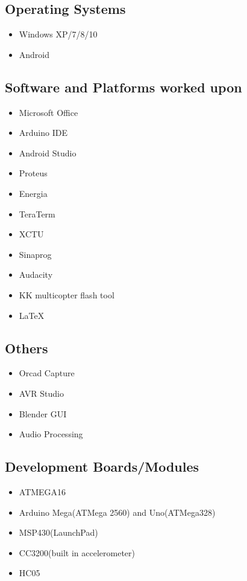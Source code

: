\documentclass[11pt]{article}
\begin{document}
\begin{minipage}{0.80\linewidth}
\subsection{Operating Systems}
\begin{itemize}
\item Windows XP/7/8/10
\item Android
\end{itemize}
\subsection{Software and Platforms worked upon}
\begin{itemize}
\item Microsoft Office
\item Arduino IDE
\item Android Studio
\item Proteus
\item Energia
\item TeraTerm
\item XCTU
\item Sinaprog
\item Audacity
\item KK multicopter flash tool
\item LaTeX
\end{itemize}
\subsection{Others}
\begin{itemize}
\item Orcad Capture
\item AVR Studio
\item Blender GUI
\item Audio Processing
\end{itemize}
\subsection{Development Boards/Modules}
\begin{itemize}
\item ATMEGA16
\item Arduino Mega(ATMega 2560) and Uno(ATMega328)
\item MSP430(LaunchPad)
\item CC3200(built in accelerometer)
\item HC05
\end{itemize}

\end{minipage}
\end{document}
